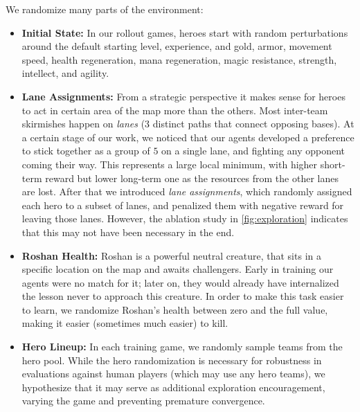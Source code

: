 \documentclass[ocean-paper.tex]{subfiles}
\begin{document}
\label{sec:lane-assignments}
We randomize many parts of the environment:
\begin{itemize}
\item \textbf{Initial State: }
In our rollout games, heroes start with random perturbations around the default starting level, experience, and gold, armor, movement speed, health regeneration, mana regeneration, magic resistance, strength, intellect, and agility.
\item \textbf{Lane Assignments: }
From a strategic perspective it makes sense for heroes to act in certain area of the map more than the others.
Most inter-team skirmishes happen on {\it lanes}  ($3$ distinct paths that connect opposing bases).
At a certain stage of our work, we noticed that our agents developed a preference to stick together as a group of $5$ on a single lane, and fighting any opponent coming their way.
This represents a large local minimum, with higher short-term reward but lower long-term one as the resources from the other lanes are lost.
After that we introduced {\it lane assignments}, which randomly assigned each hero to a subset of lanes, and penalized them with negative reward for leaving those lanes.
However, the ablation study in \autoref{fig:exploration} indicates that this may not have been necessary in the end.
\item \textbf{Roshan Health: }Roshan is a powerful neutral creature, that sits in a specific location on the map and awaits challengers.
Early in training our agents were no match for it; later on, they would already have internalized the lesson never to approach this creature.
In order to make this task easier to learn, we randomize Roshan's health between zero and the full value, making it easier (sometimes much easier) to kill.
\item 
\textbf{Hero Lineup: }
In each training game, we randomly sample teams from the hero pool.
While the hero randomization is necessary for robustness in evaluations  against human players (which may use any hero teams), we hypothesize that it may serve as additional exploration encouragement, varying the game and preventing premature convergence.

\end{itemize}
\end{document}
